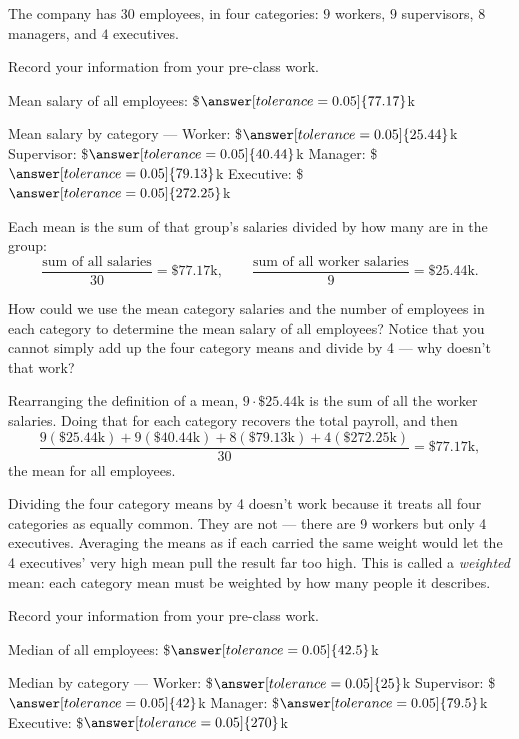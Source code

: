 \documentclass[12pt]{ximera}
\begin{document}
The company has $30$ employees, in four categories: $9$ workers, $9$ supervisors,
$8$ managers, and $4$ executives.

\begin{problem}
Record your information from your pre-class work.

Mean salary of all employees: \$$\answer[tolerance=0.05]{77.17}$k

Mean salary by category --- Worker: \$$\answer[tolerance=0.05]{25.44}$k \quad
Supervisor: \$$\answer[tolerance=0.05]{40.44}$k \quad
Manager: \$$\answer[tolerance=0.05]{79.13}$k \quad
Executive: \$$\answer[tolerance=0.05]{272.25}$k

\begin{solution}
Each mean is the sum of that group's salaries divided by how many are in the group:
\[
\frac{\text{sum of all salaries}}{30} = \$77.17\text{k},
\qquad
\frac{\text{sum of all worker salaries}}{9} = \$25.44\text{k}.
\]
\end{solution}
\end{problem}

\begin{problem}
How could we use the mean category salaries and the number of employees in each
category to determine the mean salary of all employees? Notice that you cannot simply
add up the four category means and divide by 4 --- why doesn't that work?

\begin{freeResponse}
\end{freeResponse}

\begin{solution}
Rearranging the definition of a mean, $9 \cdot \$25.44\text{k}$ is the sum of all the
worker salaries. Doing that for each category recovers the total payroll, and then
\[
\frac{9(\$25.44\text{k}) + 9(\$40.44\text{k}) + 8(\$79.13\text{k}) + 4(\$272.25\text{k})}{30}
= \$77.17\text{k},
\]
the mean for all employees.

Dividing the four category means by 4 doesn't work because it treats all four
categories as equally common. They are not --- there are 9 workers but only 4
executives. Averaging the means as if each carried the same weight would let the 4
executives' very high mean pull the result far too high. This is called a
\emph{weighted} mean: each category mean must be weighted by how many people it
describes.
\end{solution}
\end{problem}

\begin{problem}
Record your information from your pre-class work.

Median of all employees: \$$\answer[tolerance=0.05]{42.5}$k

Median by category --- Worker: \$$\answer[tolerance=0.05]{25}$k \quad
Supervisor: \$$\answer[tolerance=0.05]{42}$k \quad
Manager: \$$\answer[tolerance=0.05]{79.5}$k \quad
Executive: \$$\answer[tolerance=0.05]{270}$k
\end{problem}
\end{document}
